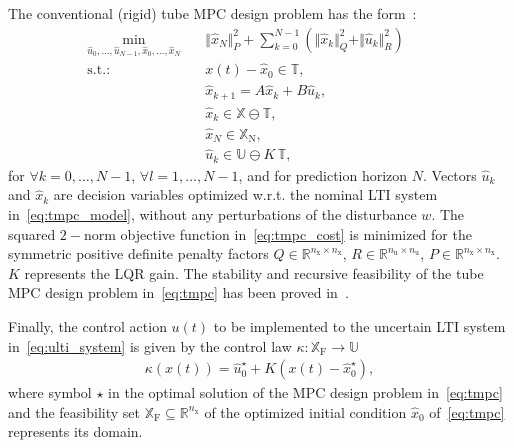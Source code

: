 \documentclass[letterpaper, 10 pt, conference]{ieeeconf}
\begin{document}
	The conventional (rigid) tube MPC design problem has the form~\cite{MS05}:
	\begin{subequations}
		\label{eq:tmpc}
		\begin{eqnarray}
			\label{eq:tmpc_cost}
			\min_{\hat{u}_{0},\ldots,\hat{u}_{N-1}, \hat{x}_{0},\ldots,\hat{x}_{N} } \!\!\!\!\!\!\!\!\!\!\! &\,& \Vert \hat{x}_{N} \Vert_{P}^{2} + \sum_{k=0}^{N-1} \left( \Vert \hat{x}_{k} \Vert_{Q}^{2} + \Vert \hat{u}_{k} \Vert_{R}^{2} \right) \qquad \\
			\label{eq:tmpc_rpi}
			\mathrm{s.t.\!:} &\,& x(t) - \hat{x}_{0} \in \mathbb{T} , \\
			\label{eq:tmpc_model}
			&\,&  \hat{x}_{k+1} = A \hat{x}_{k} + B \hat{u}_{k} , \\
			\label{eq:tmpc_constraints_state}
			&\,& \hat{x}_{k} \in \mathbb{X} \ominus \mathbb{T} , \\
			\label{eq:tmpc_constraints_terminal}
			&\,& \hat{x}_{N} \in \mathbb{X}_{\mathrm{N}}, \\
			\label{eq:tmpc_constraints_input}
			&\,& \hat{u}_{k} \in \mathbb{U} \ominus K \, \mathbb{T} , 
		\end{eqnarray}
	\end{subequations}
	for $\forall k = 0, \dots, N-1$,  $\forall l = 1, \dots, N-1$, and for prediction horizon $N$. Vectors $\hat{u}_{k}$ and $\hat{x}_{k}$ are decision variables optimized w.r.t. the nominal LTI system in~\eqref{eq:tmpc_model}, without any perturbations of the disturbance $w$. 
	The squared $2-$norm objective function in~\eqref{eq:tmpc_cost} is minimized for the symmetric positive definite penalty factors $Q \in \mathbb{R}^{n_{\mathrm{x}} \times n_{\mathrm{x}}}$, $R \in \mathbb{R}^{n_{\mathrm{u}} \times n_{\mathrm{u}}}$, $P \in \mathbb{R}^{n_{\mathrm{x}} \times n_{\mathrm{x}}}$. $K$ represents the LQR gain. 
	The stability and recursive feasibility of the tube MPC design problem in~\eqref{eq:tmpc} has been proved in~\cite{MS05}.
	
	Finally, the control action $u(t)$ to be implemented to the uncertain LTI system in~\eqref{eq:ulti_system} is given by the control law $\kappa : \mathbb{X}_{\mathrm{F}} \rightarrow \mathbb{U}$
	\begin{eqnarray}
		\label{eq:tmpc_control_law}
		\kappa(x(t)) = \hat{u}_{0}^{\star} + K \left( x(t) - \hat{x}_{0}^{\star} \right),
	\end{eqnarray}
	where symbol $\star$ in the optimal solution of the MPC design problem in~\eqref{eq:tmpc} and the feasibility set $\mathbb{X}_{\mathrm{F}} \subseteq \mathbb{R}^{n_{\mathrm{x}}}$ of the optimized initial condition $\hat{x}_{0}$ of~\eqref{eq:tmpc} represents its domain. 
	
\end{document}
